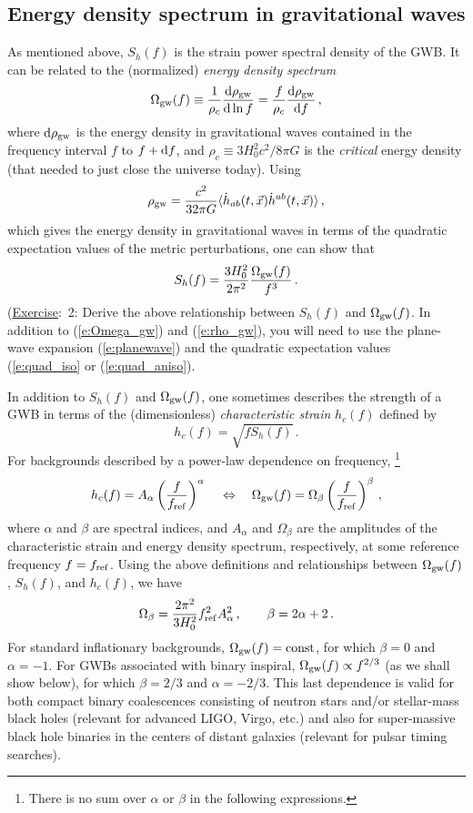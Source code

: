 \documentclass[11pt]{article}
\numberwithin{equation}{section}
\def\be{\begin{equation}}
\def\ee{\end{equation}}
\def\D{{\rm d}}
\def\exer{\underline{Exercise}:\ }
\begin{document}
\subsection{Energy density spectrum in gravitational waves}
\label{s:Omega_gw}

As mentioned above, $S_h(f)$ is the strain power 
spectral density of the GWB.
It can be related to the (normalized) 
{\em energy density spectrum}
%
\be
\Omega_{\rm gw}(f) 
\equiv \frac{1}{\rho_c}\frac{\D\rho_{\rm gw}}{\D\ln f}
=\frac{f}{\rho_c}\frac{\D\rho_{\rm gw}}{\D f}\,,
\label{e:Omega_gw}
\ee
%
where $\D\rho_{\rm gw}$ is the energy density in gravitational
waves contained in the frequency interval $f$ to $f+\D f$, and 
$\rho_c\equiv {3 H_0^2 c^2}/{8\pi G}$
is the {\em critical} energy density (that needed to just 
close the universe today).
Using
%
\be
\rho_{\rm gw} = \frac{c^2}{32\pi G}
\langle \dot h_{ab}(t,\vec x)\dot h^{ab}(t,\vec x)\rangle\,,
\label{e:rho_gw}
\ee
%
which gives the energy density in gravitational waves
in terms of the quadratic expectation values of the
metric perturbations, one can show that
%
\be
S_h(f) = \frac{3H_0^2}{2\pi^2}\frac{\Omega_{\rm gw}(f)}{f^3}\,.
\label{e:S_h_and_Omega_gw}
\ee
%
(\exer 2: Derive the above relationship 
between $S_h(f)$ and $\Omega_{\rm gw}(f)$.
In addition to (\ref{e:Omega_gw}) and (\ref{e:rho_gw}),
you will need to use the plane-wave expansion (\ref{e:planewave})
and the quadratic expectation values 
(\ref{e:quad_iso} or (\ref{e:quad_aniso}).

In addition to $S_h(f)$ and $\Omega_{\rm gw}(f)$, one
sometimes describes the strength of a GWB in terms of
the (dimensionless) {\em characteristic strain}
$h_c(f)$ defined by
%
\be
h_c(f) = \sqrt{f S_h(f)}\,.
\ee
%
For backgrounds described by a power-law dependence
on frequency,%
\footnote{There is no sum over $\alpha$ or $\beta$ in 
the following expressions.}
%
\be
h_c(f) = A_\alpha \left(\frac{f}{f_{\rm ref}}\right)^\alpha\,
\quad\Leftrightarrow\quad
\Omega_{\rm gw}(f) = \Omega_\beta\left(\frac{f}{f_{\rm ref}}\right)^\beta\,,
\label{e:powerlaw}
\ee
%
where $\alpha$ and $\beta$ are spectral indices,
and $A_\alpha$ and $\Omega_\beta$ are the amplitudes 
of the characteristic strain and energy density 
spectrum, respectively, at some reference frequency
$f=f_{\rm ref}$.
Using the above definitions and relationships between
$\Omega_{\rm gw}(f)$, $S_h(f)$, and $h_c(f)$, we have
%
\be
\Omega_\beta = \frac{2\pi^2}{3 H_0^2}f_{\rm ref}^2 A_\alpha^2\,,
\qquad
\beta = 2\alpha +2\,.
\ee
%
For standard inflationary backgrounds, $\Omega_{\rm gw}(f)={\rm const}$,
for which $\beta=0$ and $\alpha=-1$.
For GWBs associated with binary inspiral, 
$\Omega_{\rm gw}(f)\propto f^{2/3}$ (as we shall show below),
for which $\beta=2/3$ and $\alpha=-2/3$.
This last dependence is valid for both compact binary coalescences 
consisting of neutron stars and/or 
stellar-mass black holes (relevant for advanced LIGO, Virgo, etc.) 
and also for super-massive black hole binaries in the 
centers of distant galaxies (relevant for pulsar timing searches).
 
\end{document}
